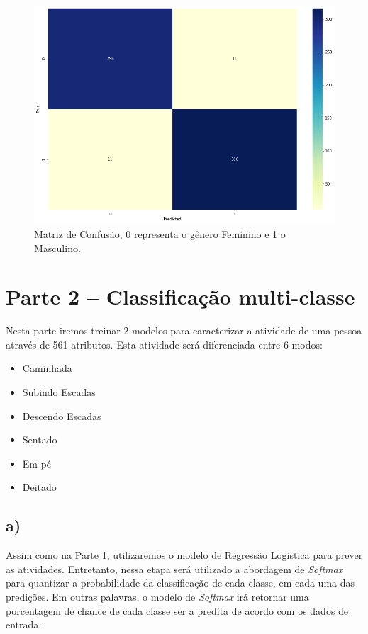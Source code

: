 \documentclass[12pt]{article}
\begin{document}
\begin{figure}[H]
	\centering
	\includegraphics[width=\linewidth]{images/conf_m.png}
	\caption{Matriz de Confusão, 0 representa o gênero Feminino e 1 o Masculino.}
	\label{fig:conf_m}
\end{figure}



\section*{Parte 2 – Classificação multi-classe}

Nesta parte iremos treinar 2 modelos para caracterizar a atividade de uma pessoa através de 561 atributos. Esta atividade será diferenciada entre 6 modos:

\begin{itemize}
	\item Caminhada
	\item Subindo Escadas
	\item Descendo Escadas
	\item Sentado
	\item Em pé
	\item Deitado
\end{itemize}

\subsection*{a)}

Assim como na Parte 1, utilizaremos o modelo de Regressão Logistica para prever as atividades. Entretanto, nessa etapa será utilizado a abordagem de \textit{Softmax} para quantizar a probabilidade da classificação de cada classe, em cada uma das predições. Em outras palavras, o modelo de \textit{Softmax} irá retornar uma porcentagem de chance de cada classe ser a predita de acordo com os dados de entrada.
\end{document}
